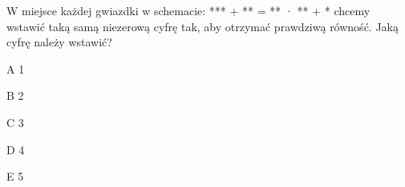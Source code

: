 \begin{tresc}
W miejsce każdej gwiazdki w schemacie: *** + ** = ** · ** + * chcemy wstawić taką samą niezerową cyfrę tak, aby otrzymać prawdziwą równość. Jaką cyfrę należy wstawić?
\end{tresc}
\begin{wariant}{A} 1 \end{wariant}
\begin{wariant}{B} 2 \end{wariant}
\begin{wariant}{C} 3 \end{wariant}
\begin{wariant}{D} 4 \end{wariant}
\begin{wariant}{E} 5 \end{wariant}
